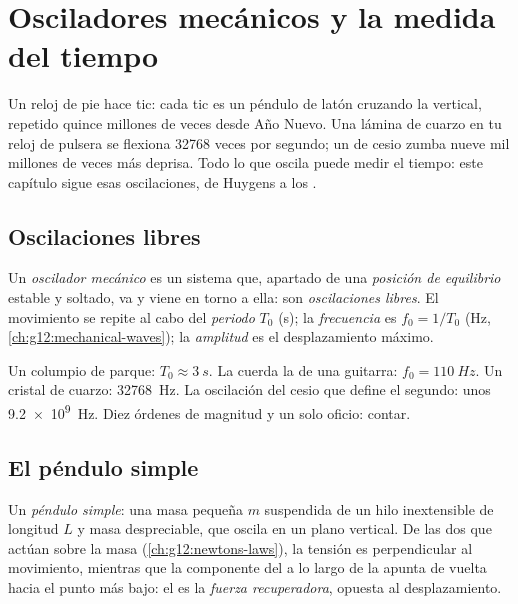 \chapter{Osciladores mecánicos y la medida del tiempo}\label{ch:g12:oscillators-and-time}

Un reloj de pie hace tic: cada tic es un péndulo de latón cruzando la vertical,
repetido quince millones de veces desde Año Nuevo. Una lámina de cuarzo en tu reloj de
pulsera se flexiona \num{32768} veces por segundo; un  de cesio zumba nueve mil
millones de veces más deprisa. Todo lo que oscila puede medir el tiempo: este capítulo
sigue esas oscilaciones, de Huygens a los .

\section{Oscilaciones libres}

\begin{definition}\label{def:g12:oscillators-and-time:oscillator}
Un \emph{oscilador mecánico} es un sistema que, apartado de una
\emph{posición de equilibrio} estable y soltado, va y
viene en torno a ella: son \emph{oscilaciones libres}. El
movimiento se repite al cabo del \emph{periodo} $T_0$ (\unit{s}); la
\emph{frecuencia} es $f_0 = 1/T_0$ (\unit{Hz},
\cref{ch:g12:mechanical-waves}); la \emph{amplitud} es el
desplazamiento máximo.
\end{definition}

\begin{example}\label{ex:g12:oscillators-and-time:zoo}
Un columpio de parque: $T_0 \approx \qty{3}{s}$. La cuerda la de una guitarra:
$f_0 = \qty{110}{Hz}$. Un cristal de cuarzo: \qty{32768}{Hz}. La oscilación del cesio
que define el segundo: unos \qty{9.2e9}{Hz}. Diez órdenes de magnitud y un solo
oficio: contar.
\end{example}

\section{El péndulo simple}

\begin{definition}\label{def:g12:oscillators-and-time:pendulum}
Un \emph{péndulo simple}: una masa pequeña $m$ suspendida de un
hilo inextensible de longitud $L$ y masa despreciable, que oscila en un plano
vertical. De las dos  que actúan sobre la masa (\cref{ch:g12:newtons-laws}), la
tensión es perpendicular al movimiento, mientras que la componente del  a lo largo
de la  apunta de vuelta hacia el punto más bajo: el  es la \emph{fuerza
recuperadora}, opuesta al desplazamiento.
\end{definition}

